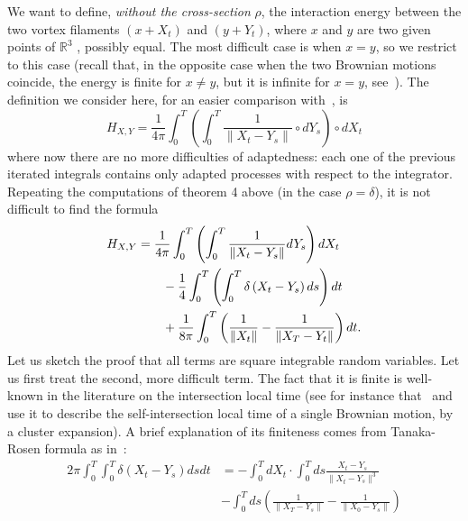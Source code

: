 We want to define, \textit{without the cross-section} $\rho $, the
interaction energy between the two vortex filaments $(x+X_{t})$ and $\left(
y+Y_{t}\right) $, where $x$ and $y$ are two given points of $\mathbb{R}^{3}$%
, possibly equal. The most difficult case is when $x=y$, so we restrict to
this case (recall that, in the opposite case when the two Brownian motions
coincide, the energy is finite for $x\neq y$, but it is infinite for $x=y$,
see~\cite{Fl2}). The definition we consider here, for an easier comparison
with~\cite{Fl2}, is
\begin{equation*}
H_{X,Y}=\frac{1}{4\pi} \int_{0}^{T}\left( \int_{0}^{T}\frac{1}{\left\| X_{t}-Y_{s}\right\| }%
\circ dY_{s}\right) \circ dX_{t}
\end{equation*}
where now there are no more difficulties of adaptedness: each one of the previous
iterated integrals contains only adapted processes with respect to the
integrator. Repeating the computations of theorem 4 above (in the case $\rho
=\delta $), it is not difficult to find the formula
\begin{equation}
\begin{split}
H_{X,Y} & = \frac{1}{4\pi}
\int_{0}^{T}\left( \int_{0}^{T}\frac{1}{\left\| X_{t}-Y_{s}\right\| }%
dY_{s}\right) dX_{t}
\\ & \qquad
- \frac{1}{4} \int_{0}^{T}\left( \int_{0}^{T}\delta \left(
X_{t}-Y_{s}\right) ds\right) dt
\\ & \qquad
+\frac{1}{8 \pi}\int_{0}^{T}\left( \frac{1}{\left\| X_{t}\right\| }-\frac{1}{%
\left\| X_{T}-Y_{t}\right\| }\right) dt. 
\end{split}
 \label{inter}
\end{equation}
Let us sketch the proof that all terms are square integrable random
variables. Let us first treat the second, more difficult term. The fact that
it is finite is well-known in the literature on the intersection local time
(see for instance that~\cite{We} and~\cite{LeG1} use it to
describe the self-intersection local time of a single Brownian motion, by a
cluster expansion). A brief explanation of its finiteness comes from
Tanaka-Rosen formula as in~\cite{Yo1}:
\begin{equation}
\begin{split}
2 \pi \int_{0}^{T} \int_{0}^{T} \delta\left(
X_{t}-Y_{s}\right) ds dt & =  - \int_{0}^{T} dX_t  \cdot \int_{0}^{T} ds \frac{X_t -
Y_s}{\| X_t - Y_s \|^3} 
\\ \qquad & - \int_{0}^{T} ds \left( \frac{1}{\| X_T - Y_s\|} - 
\frac{1}{\|X_0 - Y_s \|}
\right) 
\end{split}
\end{equation}
